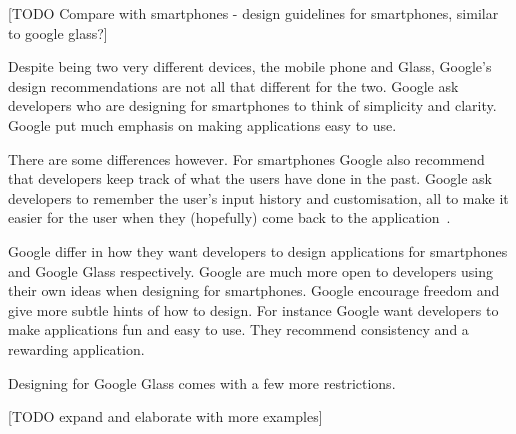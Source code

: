 [TODO Compare with smartphones - design guidelines for smartphones, similar to google glass?]

Despite being two very different devices, the mobile phone and Glass, Google's design recommendations are not all that different for the two. Google ask developers who are designing for smartphones to think of simplicity and clarity. Google put much emphasis on making applications easy to use.

There are some differences however. For smartphones Google also recommend that developers keep track of what the users have done in the past. Google ask developers to remember the user's input history and customisation, all to make it easier for the user when they (hopefully) come back to the application~\cite{androidDesignPrinciples}.

Google differ in how they want developers to design applications for smartphones and Google Glass respectively. Google are much more open to developers using their own ideas when designing for smartphones. Google encourage freedom and give more subtle hints of how to design. For instance Google want developers to make applications fun and easy to use. They recommend consistency and a rewarding application.

Designing for Google Glass comes with a few more restrictions. 

[TODO expand and elaborate with more examples]